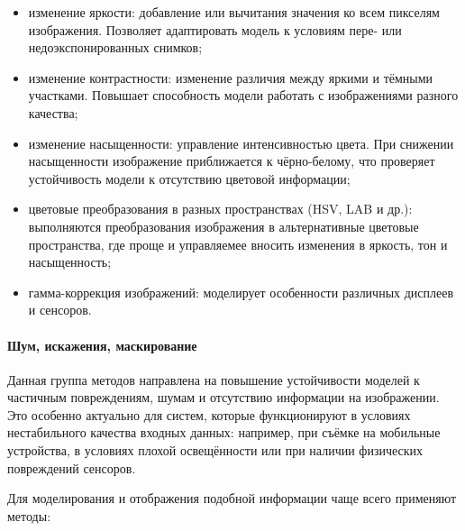 \begin{itemize}
	\item изменение яркости: добавление или вычитания значения ко всем пикселям изображения. Позволяет адаптировать модель к условиям пере- или недоэкспонированных снимков;
	\item изменение контрастности: изменение различия между яркими и тёмными участками. Повышает способность модели работать с изображениями разного качества;
	\item изменение насыщенности: управление интенсивностью цвета. При снижении насыщенности изображение приближается к чёрно-белому, что проверяет устойчивость модели к отсутствию цветовой информации;
	\item цветовые преобразования в разных пространствах (HSV, LAB и др.): выполняются преобразования изображения в альтернативные цветовые пространства, где проще и управляемее вносить изменения в яркость, тон и насыщенность;
	\item гамма-коррекция изображений: моделирует особенности различных дисплеев и сенсоров.
\end{itemize}

\paragraph{Шум, искажения, маскирование}

Данная группа методов направлена на повышение устойчивости моделей к частичным повреждениям, шумам и отсутствию информации на изображении. Это особенно актуально для систем, которые функционируют в условиях нестабильного качества входных данных: например, при съёмке на мобильные устройства, в условиях плохой освещённости или при наличии физических повреждений сенсоров.

Для моделирования и отображения подобной информации чаще всего применяют методы:

